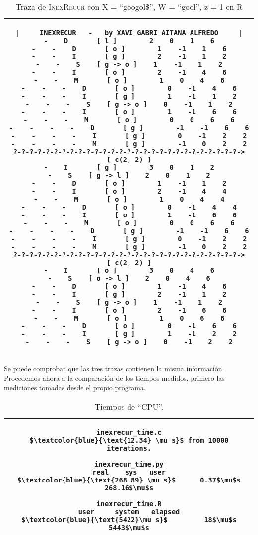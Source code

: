 \documentclass{article}
\newcommand{\tempcaption}{}
\newenvironment{code}[4]{
\begin{table}[h!]
\gdef\tempcaption{Traza de \textsc{InexRecur} con X = ``#1'', W = ``#2'', z = #3 en #4}
\centering
\begin{tabular}{|c|}
\hline }
{\\\hline
\end{tabular}
\caption{\tempcaption}
\end{table} }
\newenvironment{codesnip}[1]{
\begin{table}[h!]
\gdef\tempcaption{#1}
\centering
\begin{tabular}{|c|}
\hline}
{\\\hline
\end{tabular}
\caption{\tempcaption}
\end{table}}
\newcommand{\R}{R }
\begin{document}
\vfill
\begin{code}{googol\$}{gool}{1}{\R}
\begin{lstlisting}
|     INEXRECUR   -   by XAVI GABRI AITANA ALFREDO     |
-    D       [ l ]        2    0    1    6
-    -    D       [ o ]        1    -1    1    6
-    -    I       [ g ]        2    -1    1    2
-    -    S    [ g -> o ]    1    -1    1    2
-    -    I       [ o ]        2    -1    4    6
-    -    M       [ o ]        1    0    4    6
-    -    -    D       [ o ]        0    -1    4    6
-    -    -    I       [ g ]        1    -1    1    2
-    -    -    S    [ g -> o ]    0    -1    1    2
-    -    -    I       [ o ]        1    -1    6    6
-    -    -    M       [ o ]        0    0    6    6
-    -    -    -    D       [ g ]        -1    -1    6    6
-    -    -    -    I       [ g ]        0    -1    2    2
-    -    -    -    M       [ g ]        -1    0    2    2
?-?-?-?-?-?-?-?-?-?-?-?-?-?-?-?-?-?-?-?-?-?-?-?-?-?-?-?->  [ c(2, 2) ]
-    I       [ g ]        3    0    1    2
-    S    [ g -> l ]    2    0    1    2
-    -    D       [ o ]        1    -1    1    2
-    -    I       [ o ]        2    -1    4    4
-    -    M       [ o ]        1    0    4    4
-    -    -    D       [ o ]        0    -1    4    4
-    -    -    I       [ o ]        1    -1    6    6
-    -    -    M       [ o ]        0    0    6    6
-    -    -    -    D       [ g ]        -1    -1    6    6
-    -    -    -    I       [ g ]        0    -1    2    2
-    -    -    -    M       [ g ]        -1    0    2    2
?-?-?-?-?-?-?-?-?-?-?-?-?-?-?-?-?-?-?-?-?-?-?-?-?-?-?-?->  [ c(2, 2) ]
-    I       [ o ]        3    0    4    6
-    S    [ o -> l ]    2    0    4    6
-    -    D       [ o ]        1    -1    4    6
-    -    I       [ g ]        2    -1    1    2
-    -    S    [ g -> o ]    1    -1    1    2
-    -    I       [ o ]        2    -1    6    6
-    -    M       [ o ]        1    0    6    6
-    -    -    D       [ o ]        0    -1    6    6
-    -    -    I       [ g ]        1    -1    2    2
-    -    -    S    [ g -> o ]    0    -1    2    2
\end{lstlisting}
\end{code}
\vfill

\clearpage

Se puede comprobar que las tres trazas contienen la misma información.
Procedemos ahora a la comparación de los tiempos medidos, primero  las
mediciones tomadas desde el propio programa.
\begin{codesnip}{Tiempos de ``CPU''.}
\begin{lstlisting}
inexrecur_time.c
$\textcolor{blue}{\text{12.34} \mu s}$ from 10000 iterations.

inexrecur_time.py
real    sys   user
$\textcolor{blue}{\text{268.89} \mu s}$      0.37$\mu$s 268.16$\mu$s

inexrecur_time.R
user     system   elapsed
$\textcolor{blue}{\text{5422}\mu s}$         18$\mu$s      5443$\mu$s
\end{lstlisting}
\end{codesnip}
\end{document}
